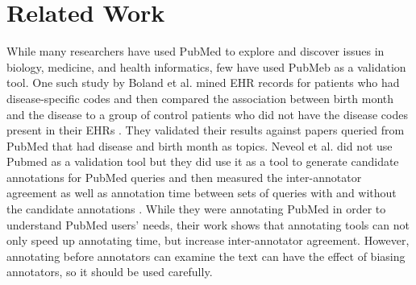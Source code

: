 \documentclass{sig-alternate}
\begin{document}


\section{Related Work}
While many researchers have used PubMed to explore and discover issues in biology, medicine, and health informatics, few have used PubMeb as a validation tool.
One such study by Boland et al. mined EHR records for patients who had disease-specific codes and then compared the association between birth month and the disease to a group of control patients who did not have the disease codes present in their EHRs \cite{boland2015birth}. 
They validated their results against papers queried from PubMed that had disease and birth month as topics.
Neveol  et al. did not use Pubmed as a validation tool but they did use it as a tool to generate candidate annotations for PubMed queries and then measured the inter-annotator agreement as well as annotation time between sets of queries with and without the candidate annotations \cite{neveol2011semi}. 
While they were annotating PubMed in order to understand PubMed users' needs, their work shows that annotating tools can not only speed up annotating time, but increase inter-annotator agreement.
However, annotating before annotators can examine the text can have the effect of biasing annotators, so it should be used carefully.
\end{document}
